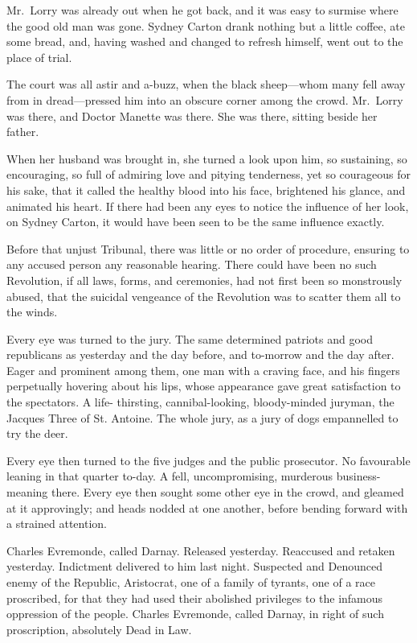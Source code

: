 Mr.\ Lorry was already out when he got back, and it was easy to
surmise where the good old man was gone.  Sydney Carton drank nothing
but a little coffee, ate some bread, and, having washed and changed
to refresh himself, went out to the place of trial.

The court was all astir and a-buzz, when the black sheep---whom many
fell away from in dread---pressed him into an obscure corner among the
crowd.  Mr.\ Lorry was there, and Doctor Manette was there.  She was
there, sitting beside her father.

When her husband was brought in, she turned a look upon him, so
sustaining, so encouraging, so full of admiring love and pitying
tenderness, yet so courageous for his sake, that it called the
healthy blood into his face, brightened his glance, and animated his
heart.  If there had been any eyes to notice the influence of her
look, on Sydney Carton, it would have been seen to be the same
influence exactly.

Before that unjust Tribunal, there was little or no order of
procedure, ensuring to any accused person any reasonable hearing.
There could have been no such Revolution, if all laws, forms, and
ceremonies, had not first been so monstrously abused, that the
suicidal vengeance of the Revolution was to scatter them all to the
winds.

Every eye was turned to the jury.  The same determined patriots and
good republicans as yesterday and the day before, and to-morrow and
the day after.  Eager and prominent among them, one man with a
craving face, and his fingers perpetually hovering about his lips,
whose appearance gave great satisfaction to the spectators.  A life-%
thirsting, cannibal-looking, bloody-minded juryman, the Jacques Three
of St. Antoine.  The whole jury, as a jury of dogs empannelled to try
the deer.

Every eye then turned to the five judges and the public prosecutor.
No favourable leaning in that quarter to-day.  A fell, uncompromising,
murderous business-meaning there.  Every eye then sought some other
eye in the crowd, and gleamed at it approvingly; and heads nodded at
one another, before bending forward with a strained attention.

Charles Evremonde, called Darnay.  Released yesterday.  Reaccused and
retaken yesterday.  Indictment delivered to him last night. Suspected
and Denounced enemy of the Republic, Aristocrat, one of a family of
tyrants, one of a race proscribed, for that they had used their
abolished privileges to the infamous oppression of the people.
Charles Evremonde, called Darnay, in right of such proscription,
absolutely Dead in Law.

